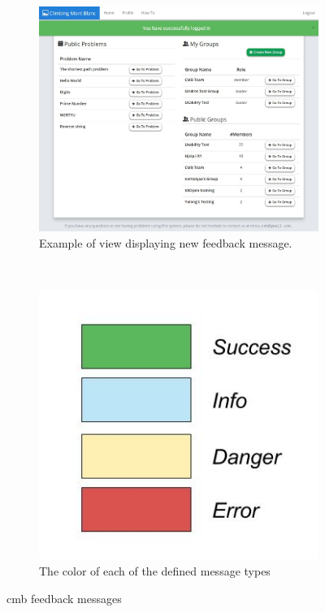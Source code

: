 \begin{figure}[h!]
    \centering
    \begin{subfigure}[b]{0.48\textwidth}
        \includegraphics[width=\textwidth]{figs/new_message.jpg}
        \caption{Example of view displaying new feedback message.}
        \label{fig:new-message}
    \end{subfigure}
    ~ %
    \begin{subfigure}[b]{0.48\textwidth}
        \includegraphics[width=\textwidth]{figs/type_color.jpg}
        \caption{The color of each of the defined message types}
        \label{fig:type-color}
    \end{subfigure}
    \caption{\gls{cmb} feedback messages}
    \label{fig:new-feedback}
\end{figure}
